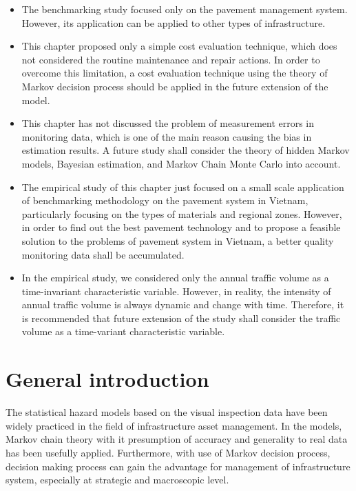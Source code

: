 \begin{itemize}
\item The benchmarking study focused only on the pavement management system. However, its application can be applied to other types of infrastructure.
\item This chapter proposed only a simple cost evaluation technique, which does not considered the routine maintenance and repair actions. In order to overcome this limitation, a cost evaluation technique using the theory of Markov decision process should be applied in the future extension of the model.
\item This chapter has not discussed the problem of measurement errors in monitoring data, which is one of the main reason causing the bias in estimation results. A future study shall consider the theory of hidden Markov models, Bayesian estimation, and Markov Chain Monte Carlo into account.
\item The empirical study of this chapter just focused on a small scale application of benchmarking methodology on the pavement system in Vietnam, particularly focusing on the types of materials and regional zones. However, in order to find out the best pavement technology and to propose a feasible solution to the problems of pavement system in Vietnam, a better quality monitoring data shall be accumulated.
\item In the empirical study, we considered only the annual traffic volume as a time-invariant characteristic variable. However, in reality, the intensity of annual traffic volume is always dynamic and change with time. Therefore, it is recommended that future extension of the study shall consider the traffic volume as a time-variant characteristic variable.
\end{itemize}

\section{General introduction}
\label{61}
The statistical hazard models based on the visual inspection data have been widely practiced in the field of infrastructure asset management. In the models, Markov chain theory with it presumption of accuracy and generality to real data has been usefully applied. Furthermore, with use of Markov decision process, decision making process can gain the advantage for management of infrastructure system, especially at strategic and macroscopic level.
 
